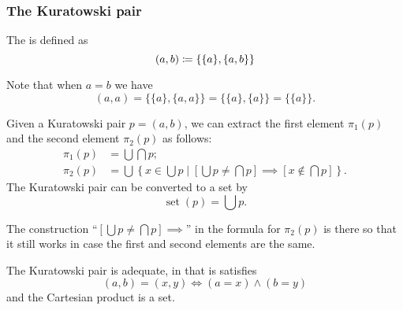 \subsubsection{The Kuratowski pair}
\begin{definition}
The  is defined as
\[ (a,b) \coloneqq \{\{a\}, \{a,b\}\} \]
\end{definition}
Note that when $a=b$ we have
\[ (a,a) = \{\{a\},\{a,a\}\} = \{\{a\},\{a\}\} = \{\{a\}\}. \]
\begin{lemma}
Given a Kuratowski pair $p = (a,b)$, we can extract the first element $\pi_1(p)$ and the second element $\pi_2(p)$ as follows:
\begin{align*}
\pi_1(p) &= \bigcup\bigcap p; \\
\pi_2(p) &= \bigcup\left\{ x\in\bigcup p\;|\; \left[\bigcup p \neq \bigcap p\right] \implies \left[ x\notin \bigcap p \right] \right\}.
\end{align*}
The Kuratowski pair can be converted to a set by
\[ \operatorname{set}(p) = \bigcup p. \]
\end{lemma}
The construction ``$\left[\bigcup p \neq \bigcap p\right] \implies$'' in the formula for $\pi_2(p)$ is there so that it still works in case the first and second elements are the same.
\begin{proposition}
The Kuratowski pair is adequate, in that is satisfies
\[ (a,b) = (x,y) \iff (a=x)\land (b=y) \]
and the Cartesian product is a set.
\end{proposition}

